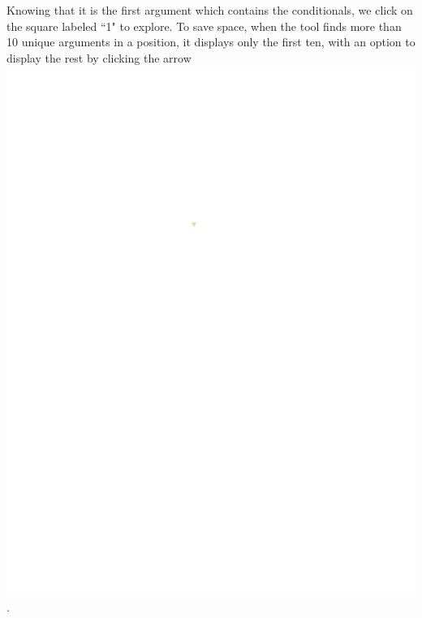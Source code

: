 \documentclass[conference]{IEEEtran}
\begin{document}
	Knowing that it is the first argument which contains the conditionals, we click
	on the square labeled ``1" to explore. To save space, when the tool finds more than 10 unique
	arguments in a position, it displays only the first
	ten, with an option to display the rest by clicking the arrow
	\includegraphics{glossary-arrow}.
	
\end{document}
